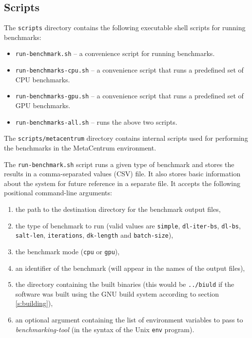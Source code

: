 \documentclass[12pt,oneside]{fithesis2}
\begin{document}
      \subsection{Scripts}
      The \verb|scripts| directory contains the following executable shell scripts for running benchmarks:
      \begin{itemize}
        \item \verb|run-benchmark.sh| -- a convenience script for running benchmarks.
        \item \verb|run-benchmarks-cpu.sh| -- a convenience script that runs a predefined set of CPU benchmarks.
        \item \verb|run-benchmarks-gpu.sh| -- a convenience script that runs a predefined set of GPU benchmarks.
        \item \verb|run-benchmarks-all.sh| -- runs the above two scripts.
      \end{itemize}
      
      The \verb|scripts/metacentrum| directory contains internal scripts used for performing the benchmarks in the MetaCentrum environment.
      
      The \verb|run-benchmark.sh| script runs a given type of benchmark and stores the results in a comma-separated values (CSV) file. It also stores basic information about the system for future reference in a separate file. It accepts the following positional command-line arguments:
      \begin{enumerate}
        \item the path to the destination directory for the benchmark output files,
        \item the type of benchmark to run (valid values are \verb|simple|, \verb|dl-iter-bs|, \verb|dl-bs|, \verb|salt-len|, \verb|iterations|, \verb|dk-length| and \verb|batch-size|),
        \item the benchmark mode (\verb|cpu| or \verb|gpu|),
        \item an identifier of the benchmark (will appear in the names of the output files),
        \item the directory containing the built binaries (this would be \verb|../biuld| if the software was built using the GNU build system according to section \ref{s:building}),
        \item an optional argument containing the list of environment variables to pass to \emph{benchmarking-tool} (in the syntax of the Unix \verb|env| program).
      \end{enumerate}
      
\end{document}

